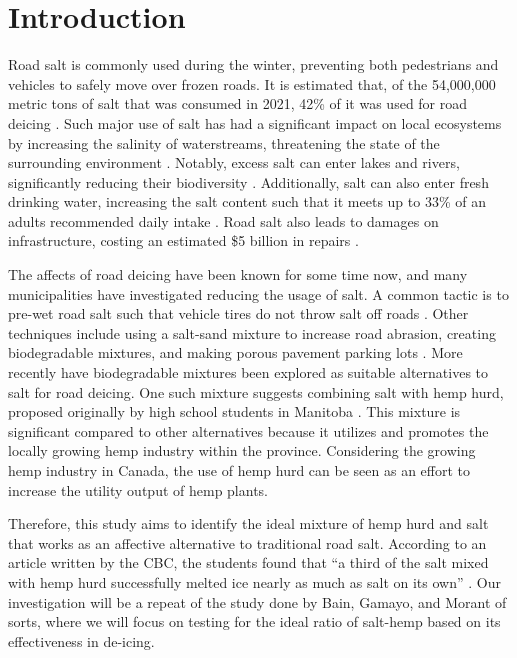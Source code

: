 \section*{Introduction}

Road salt is commonly used during the winter, preventing both pedestrians and vehicles to safely move over frozen roads.
It is estimated that, of the 54,000,000 metric tons of salt that was consumed in 2021, 42\% of it was used for road deicing \parencite{USG22}.
Such major use of salt has had a significant impact on local ecosystems by increasing the salinity of waterstreams, threatening the state of the surrounding environment \parencite{KGW20}.
Notably, excess salt can enter lakes and rivers, significantly reducing their biodiversity \parencite{HKM22}.
Additionally, salt can also enter fresh drinking water, increasing the salt content such that it meets up to 33\% of an adults recommended daily intake \parencite{CGR22}.
Road salt also leads to damages on infrastructure, costing an estimated \$5 billion in repairs \parencite{EPA20}.

The affects of road deicing have been known for some time now, and many municipalities have investigated reducing the usage of salt.
A common tactic is to pre-wet road salt such that vehicle tires do not throw salt off roads \parencites{ZAS20}{UFK17}.
Other techniques include using a salt-sand mixture to increase road abrasion, creating biodegradable mixtures, and making porous pavement parking lots \parencite{EPA20}.
More recently have biodegradable mixtures been explored as suitable alternatives to salt for road deicing.
One such mixture suggests combining salt with hemp hurd, proposed originally by high school students in Manitoba \parencite{KAV21}.
This mixture is significant compared to other alternatives because it utilizes and promotes the locally growing hemp industry within the province.
Considering the growing hemp industry in Canada, the use of hemp hurd can be seen as an effort to increase the utility output of hemp plants.

Therefore, this study aims to identify the ideal mixture of hemp hurd and salt that works as an affective alternative to traditional road salt.
According to an article written by the CBC, the students found that ``a third of the salt mixed with hemp hurd successfully melted ice nearly as much as salt on its own'' \parencite{KAV21}.
Our investigation will be a repeat of the study done by Bain, Gamayo, and Morant of sorts, where we will focus on testing for the ideal ratio of salt-hemp based on its effectiveness in de-icing.